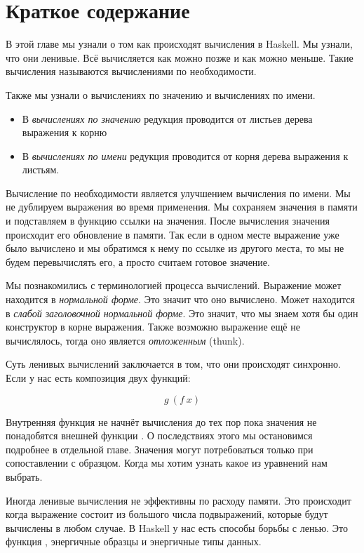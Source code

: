 \section{Краткое содержание}

В этой главе мы узнали о том как происходят вычисления
в Haskell. Мы узнали, что они ленивые. Всё вычисляется
как можно позже и как можно меньше. Такие вычисления
называются вычислениями по необходимости.

Также мы узнали о вычислениях по значению и вычислениях по имени.

\begin{itemize}
\item В \emph{вычислениях по значению} редукция проводится от 
        листьев дерева выражения к корню
\item В \emph{вычислениях по имени} редукция проводится от корня 
        дерева выражения к листьям.
\end{itemize}

Вычисление по необходимости является улучшением 
вычисления по имени. Мы не дублируем выражения
во время применения. Мы сохраняем значения в памяти 
и подставляем в функцию ссылки на значения. После вычисления
значения происходит его обновление в памяти. Так если в 
одном месте выражение уже было вычислено и мы обратимся к нему
по ссылке из другого места, то мы не будем перевычислять его,
а просто считаем готовое значение.

Мы познакомились с терминологией процесса вычислений.
Выражение может находится в \emph{нормальной форме}. Это значит
что оно вычислено. Может находится в \emph{слабой заголовочной
нормальной форме}. Это значит, что мы знаем хотя бы один 
конструктор в корне выражения. Также возможно выражение 
ещё не вычислялось, тогда оно является \emph{отложенным} (thunk).

Суть ленивых вычислений заключается в том, что они
происходят синхронно. Если у нас есть 
композиция двух функций:

\[ g\ (f\ x) \]

Внутренняя функция  не начнёт вычисления до тех
пор пока значения не понадобятся внешней функции .
О последствиях этого мы остановимся подробнее в отдельной главе.
Значения могут потребоваться только при сопоставлении с образцом.
Когда мы хотим узнать какое из уравнений нам выбрать.

 Иногда ленивые вычисления не эффективны по расходу памяти. 
Это происходит когда выражение состоит из большого числа
подвыражений, которые будут вычислены в любом случае.
В Haskell у нас есть способы борьбы с ленью. 
Это функция , энергичные образцы и энергичные типы данных. 

